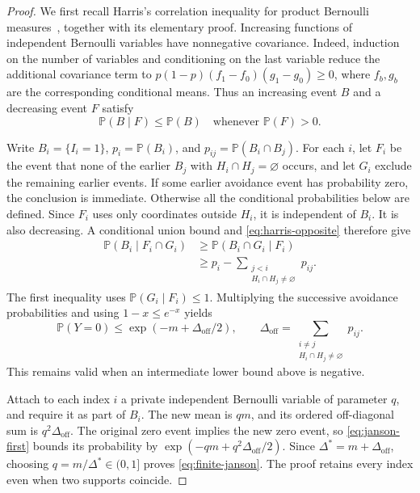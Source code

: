 \begin{proof}
We first recall Harris's correlation inequality for product Bernoulli
measures~\cite{Harris1960Correlation}, together with its elementary proof.
Increasing functions of independent Bernoulli variables have nonnegative
covariance. Indeed, induction on the number of variables and conditioning
on the last variable reduce the additional covariance term to
$p(1-p)(f_1-f_0)(g_1-g_0)\ge0$, where $f_b,g_b$ are the corresponding
conditional means. Thus an increasing event $B$ and a decreasing event
$F$ satisfy
\begin{equation}
 \mathbb{P}(B\mid F)\le\mathbb{P}(B)
 \quad\text{whenever }\mathbb{P}(F)>0.
 \label{eq:harris-opposite}
\end{equation}

Write $B_i=\{I_i=1\}$, $p_i=\mathbb{P}(B_i)$, and
$p_{ij}=\mathbb{P}(B_i\cap B_j)$. For each $i$, let $F_i$ be the event
that none of the earlier $B_j$ with $H_i\cap H_j=\varnothing$ occurs,
and let $G_i$ exclude the remaining earlier events. If some earlier
avoidance event has probability zero, the conclusion is immediate.
Otherwise all the conditional probabilities below are defined.
Since $F_i$ uses only coordinates outside $H_i$, it is independent of
$B_i$. It is also decreasing. A conditional union bound and
\eqref{eq:harris-opposite} therefore give
\[
 \begin{aligned}
 \mathbb{P}(B_i\mid F_i\cap G_i)
 &\ge\mathbb{P}(B_i\cap G_i\mid F_i)\\
 &\ge p_i-
       \sum_{\substack{j<i\\H_i\cap H_j\ne\varnothing}}p_{ij}.
 \end{aligned}
\]
The first inequality uses $\mathbb{P}(G_i\mid F_i)\le1$.
Multiplying the successive avoidance probabilities and using
$1-x\le e^{-x}$ yields
\begin{equation}
 \mathbb{P}(Y=0)\le\exp(-m+\Delta_{\mathrm{off}}/2),
 \qquad
 \Delta_{\mathrm{off}}=
 \sum_{\substack{i\ne j\\H_i\cap H_j\ne\varnothing}}p_{ij}.
 \label{eq:janson-first}
\end{equation}
This remains valid when an intermediate lower bound above is negative.

Attach to each index $i$ a private independent Bernoulli variable of
parameter $q$, and require it as part of $B_i$. The new mean is $qm$,
and its ordered off-diagonal sum is $q^2\Delta_{\mathrm{off}}$.
The original zero event implies the new zero event, so
\eqref{eq:janson-first} bounds its probability by
$\exp(-qm+q^2\Delta_{\mathrm{off}}/2)$. Since
$\Delta^*=m+\Delta_{\mathrm{off}}$, choosing $q=m/\Delta^*\in(0,1]$
proves \eqref{eq:finite-janson}. The proof retains every index even
when two supports coincide.
\end{proof}

